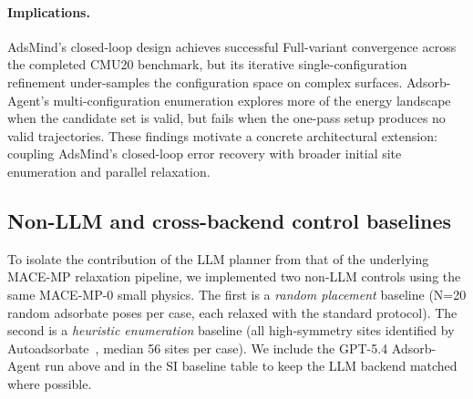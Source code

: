 \paragraph{Implications.}
AdsMind's closed-loop design achieves successful Full-variant convergence across the completed CMU20 benchmark, but its iterative single-configuration refinement under-samples the configuration space on complex surfaces.
Adsorb-Agent's multi-configuration enumeration explores more of the energy landscape when the candidate set is valid, but fails when the one-pass setup produces no valid trajectories.
These findings motivate a concrete architectural extension: coupling AdsMind's closed-loop error recovery with broader initial site enumeration and parallel relaxation.

\subsection{Non-LLM and cross-backend control baselines}

To isolate the contribution of the LLM planner from that of the underlying MACE-MP relaxation pipeline, we implemented two non-LLM controls using the same MACE-MP-0 small physics. The first is a \textit{random placement} baseline (N=20 random adsorbate poses per case, each relaxed with the standard protocol). The second is a \textit{heuristic enumeration} baseline (all high-symmetry sites identified by Autoadsorbate~\cite{fako2025simple}, median 56 sites per case).
We include the GPT-5.4 Adsorb-Agent run above and in the SI baseline table to keep the LLM backend matched where possible.

